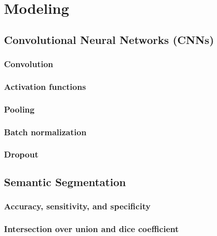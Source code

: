 \chapter{Modeling}%
\label{sec:modeling}


\section{Convolutional Neural Networks (CNNs)}%
\label{sec:cnn}

\subsection{Convolution}

\subsection{Activation functions}

\subsection{Pooling}

\subsection{Batch normalization}

\subsection{Dropout}



\section{Semantic Segmentation}%
\label{sec:semantic-segmentation}

\raggedbottom
\clearpage
\subsection{Accuracy, sensitivity, and specificity}

\subsection{Intersection over union and dice coefficient}

